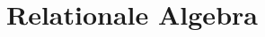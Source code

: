 \documentclass[12pt,oneside]{book}
\begin{document}
	
	
	\tableofcontents
	\clearpage

	\chapter{Relationale Algebra}
	
\end{document}
